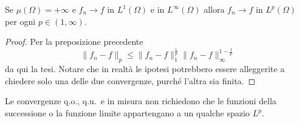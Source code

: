 \begin{corollary}
    Se \(\mu{(\Omega)} = +\infty\) e \(f_{n} \to f\) in \(L^{1}{(\Omega)}\) e
    in \(L^{\infty}{(\Omega)}\) allora \(f_{n} \to f\) in \(L^{p}{(\Omega)}\)
    per ogni \(p \in (1, \infty)\).
\end{corollary}
\begin{proof}
    Per la preposizione precedente
    \[
        \|f_{n} -f\|_p \le  \|f_{n} - f\|_1^{\frac{1}{p}} \|f_{n} -
        f\|_{\infty}^{1-\frac{1}{p}}
    \]
    da qui la tesi. Notare che in realtà le ipotesi potrebbero essere
    alleggerite a chiedere solo una delle due convergenze, purché l'altra sia
    finita.
\end{proof}
\begin{note}
    Le convergenze q.o., q.u.~e in misura non richiedono che le funzioni della
    successione o la funzione limite appartengano a un qualche spazio \(L^{p}\).
\end{note}

